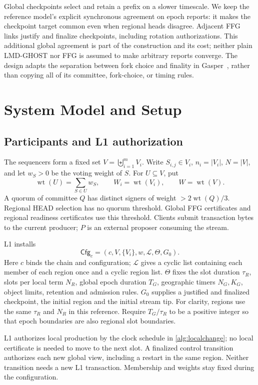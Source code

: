 \documentclass[11pt,a4paper,onecolumn]{article}
\newcommand{\Cfg}{\mathsf{Cfg}}
\newcommand{\wt}{\operatorname{wt}}
\theoremstyle{remark}\newtheorem{example}[definition]{Example}
\begin{document}
Global checkpoints select and retain a prefix on a slower timescale. We keep
the reference model's explicit synchronous agreement on epoch reports: it
makes the checkpoint target common even when regional heads disagree.
Adjacent FFG links justify and finalize checkpoints, including rotation
authorizations. This additional global agreement is part of the construction
and its cost; neither plain LMD-GHOST nor FFG is assumed to make arbitrary
reports converge. The design adapts the separation between fork choice and
finality in Gasper~\cite{gasper,ethfork,ffg}, rather than copying all of its
committee, fork-choice, or timing rules.

\section{System Model and Setup}\label{sec:model}
\subsection{Participants and L1 authorization}
The sequencers form a fixed set $V=\biguplus_{i=1}^{m}V_i$. Write
$S_{i,j}\in V_i$, $n_i=|V_i|$, $N=|V|$, and let $w_S>0$ be the voting weight
of $S$. For $U\subseteq V$, put
\[
 \wt(U)=\sum_{S\in U}w_S,\qquad W_i=\wt(V_i),\qquad W=\wt(V).
\]
A quorum of committee $Q$ has distinct signers of weight $>2\wt(Q)/3$.
Regional HEAD selection has no quorum threshold. Global FFG certificates and
regional readiness certificates use this threshold. Clients submit transaction
bytes to the current producer; $P$ is an external proposer consuming the stream.

L1 installs
\begin{equation}\label{eq:cfg}
 \Cfg_c=(c,V,\{V_i\},w,\mathcal L,\Theta,G_0).
\end{equation}
Here $c$ binds the chain and configuration; $\mathcal L$ gives a cyclic list
containing each member of each region once and a cyclic region list.
$\Theta$ fixes the slot duration $\tau_R$, slots per local term $N_R$,
global epoch duration $T_G$, geographic timers $N_G,K_G$, object limits,
retention and admission rules. $G_0$ supplies a justified and finalized
checkpoint, the initial region and the initial stream tip.
For clarity, regions use the same $\tau_R$ and $N_R$ in this reference.
Require $T_G/\tau_R$ to be a positive integer so that epoch boundaries are
also regional slot boundaries.

L1 authorizes local production by the clock schedule in
\cref{alg:localchange}; no local certificate is needed to move to the next
slot. A finalized control transition authorizes each new global view,
including a restart in the same region. Neither transition needs a new L1
transaction. Membership and weights stay fixed during the configuration.
\end{document}

